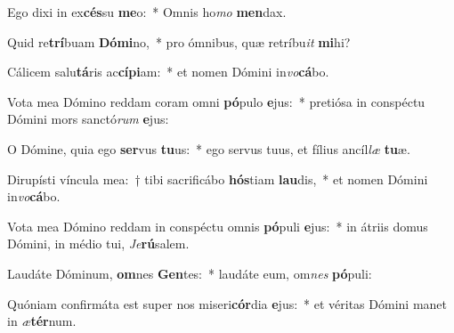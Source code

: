 \item Ego dixi in ex\textbf{cés}su \textbf{me}o:~* Omnis ho\textit{mo} \textbf{men}dax.
\item Quid re\textbf{trí}buam \textbf{Dó}\textbf{mi}no,~* pro ómnibus, quæ retríbu\textit{it} \textbf{mi}hi?
\item Cálicem salu\textbf{tá}ris ac\textbf{cí}\textbf{pi}am:~* et nomen Dómini in\textit{vo}\textbf{cá}bo.
\item Vota mea Dómino reddam coram omni \textbf{pó}pulo \textbf{e}jus:~* pretiósa in conspéctu Dómini mors sanctó\textit{rum} \textbf{e}jus:
\item O Dómine, quia ego \textbf{ser}vus \textbf{tu}us:~* ego servus tuus, et fílius ancíl\textit{læ} \textbf{tu}æ.
\item Dirupísti víncula mea:~† tibi sacrificábo \textbf{hós}tiam \textbf{lau}dis,~* et nomen Dómini in\textit{vo}\textbf{cá}bo.
\item Vota mea Dómino reddam in conspéctu omnis \textbf{pó}puli \textbf{e}jus:~* in átriis domus Dómini, in médio tui, \textit{Je}\textbf{rú}salem.
\item Laudáte Dóminum, \textbf{om}nes \textbf{Gen}tes:~* laudáte eum, om\textit{nes} \textbf{pó}puli:
\item Quóniam confirmáta est super nos miseri\textbf{cór}dia \textbf{e}jus:~* et véritas Dómini manet in \textit{æ}\textbf{tér}num.
